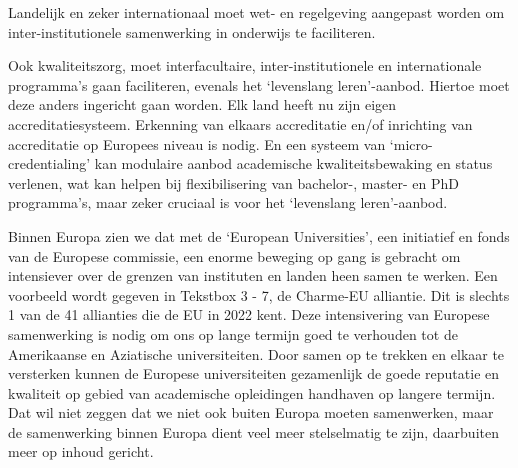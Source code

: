 \documentclass[empirical, authordate, ]{new-jote-article}
\begin{document}
	Landelijk en zeker internationaal moet wet- en regelgeving aangepast worden om inter-institutionele samenwerking in onderwijs te faciliteren.



	Ook kwaliteitszorg, moet interfacultaire, inter-institutionele en internationale programma's gaan faciliteren, evenals het ‘levenslang leren'-aanbod. Hiertoe moet deze anders ingericht gaan worden. Elk land heeft nu zijn eigen accreditatiesysteem. Erkenning van elkaars accreditatie en/of inrichting van accreditatie op Europees niveau is nodig. En een systeem van ‘micro-credentialing' kan modulaire aanbod academische kwaliteitsbewaking en status verlenen, wat kan helpen bij flexibilisering van bachelor-, master- en PhD programma's, maar zeker cruciaal is voor het ‘levenslang leren'-aanbod.



	Binnen Europa zien we dat met de ‘European Universities', een initiatief en fonds van de Europese commissie, een enorme beweging op gang is gebracht om intensiever over de grenzen van instituten en landen heen samen te werken. Een voorbeeld wordt gegeven in Tekstbox 3 - 7, de Charme-EU alliantie. Dit is slechts 1 van de 41 allianties die de EU in 2022 kent. Deze intensivering van Europese samenwerking is nodig om ons op lange termijn goed te verhouden tot de Amerikaanse en Aziatische universiteiten. Door samen op te trekken en elkaar te versterken kunnen de Europese universiteiten gezamenlijk de goede reputatie en kwaliteit op gebied van academische opleidingen handhaven op langere termijn. Dat wil niet zeggen dat we niet ook buiten Europa moeten samenwerken, maar de samenwerking binnen Europa dient veel meer stelselmatig te zijn, daarbuiten meer op inhoud gericht.
\end{document}
